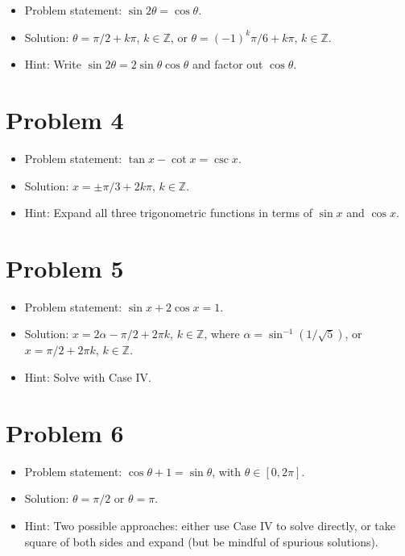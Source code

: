 \documentclass{amsart}
\begin{document}
\begin{itemize}
  \item Problem statement: $\sin 2\theta = \cos \theta$.
  \item Solution: $\theta = \pi/2 + k \pi$, $k \in \mathbb{Z}$, or $\theta = (-1)^k \pi/6 + k \pi$, $k \in \mathbb{Z}$.
  \item Hint: Write $\sin 2\theta = 2\sin\theta \cos\theta$ and factor out $\cos\theta$.
  \end{itemize}  

  \section*{Problem 4}

\begin{itemize}
  \item Problem statement: $\tan x - \cot x = \csc x$.
  \item Solution: $x = \pm \pi/3 + 2k\pi$, $k \in \mathbb{Z}$.
  \item Hint: Expand all three trigonometric functions in terms of $\sin x$ and $\cos x$.
  \end{itemize}  

  \section*{Problem 5}

\begin{itemize}
  \item Problem statement: $\sin x + 2 \cos x = 1$.
  \item Solution: $x = 2\alpha - \pi/2 + 2\pi k$, $k \in \mathbb{Z}$, where $\alpha = \sin^{-1}(1/\sqrt{5})$, or $x = \pi/2 + 2\pi k$, $k \in \mathbb{Z}$.
  \item Hint: Solve with Case IV.
  \end{itemize}  


  \section*{Problem 6}

\begin{itemize}
  \item Problem statement: $\cos \theta + 1  = \sin \theta$, with $\theta \in [0, 2\pi]$.
  \item Solution: $\theta = \pi/2$ or $\theta = \pi$.
  \item Hint: Two possible approaches: either use Case IV to solve directly, or take square of both sides and expand (but be mindful of spurious solutions).
  \end{itemize}  
\end{document}
